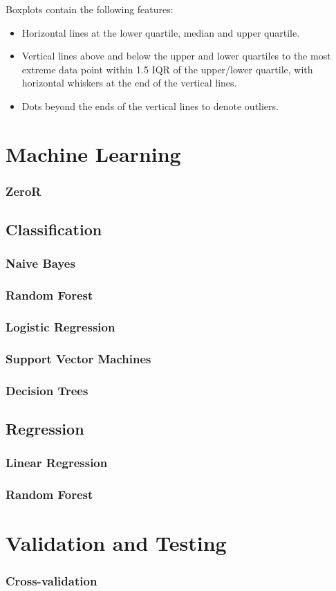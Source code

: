 Boxplots contain the following features:

\begin{itemize}
\item Horizontal lines at the lower quartile, median and upper
  quartile.
\item Vertical lines above and below the upper and lower quartiles to
  the most extreme data point within 1.5 IQR of the upper/lower
  quartile, with horizontal whiskers at the end of the vertical lines.
\item Dots beyond the ends of the vertical lines to denote outliers.
\end{itemize}


\section{Machine Learning}


\subsubsection{ZeroR}


\subsection{Classification}


\subsubsection{Naive Bayes}


\subsubsection{Random Forest}


\subsubsection{Logistic Regression}


\subsubsection{Support Vector Machines}


\subsubsection{Decision Trees}


\subsection{Regression}


\subsubsection{Linear Regression}


\subsubsection{Random Forest}


\section{Validation and Testing}


\subsubsection{Cross-validation}
